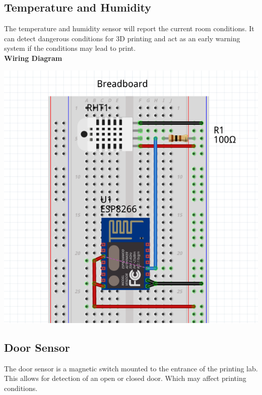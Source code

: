 \documentclass [10pt]{book}
\begin{document}
    \subsection{Temperature and Humidity}
      The temperature and humidity sensor will report the current room conditions. It
      can detect dangerous conditions for 3D printing and act as an early warning system
      if the conditions may lead to print.\\

      \textbf{Wiring Diagram}\\
            \begin{center}
      \includegraphics[scale=0.25]{temp-diagram.png}
\end{center}

    \subsection{Door Sensor}
      The door sensor is a magnetic switch mounted to the entrance of the printing lab.
      This allows for detection of an open or closed door. Which may affect printing conditions.\\
\end{document}
